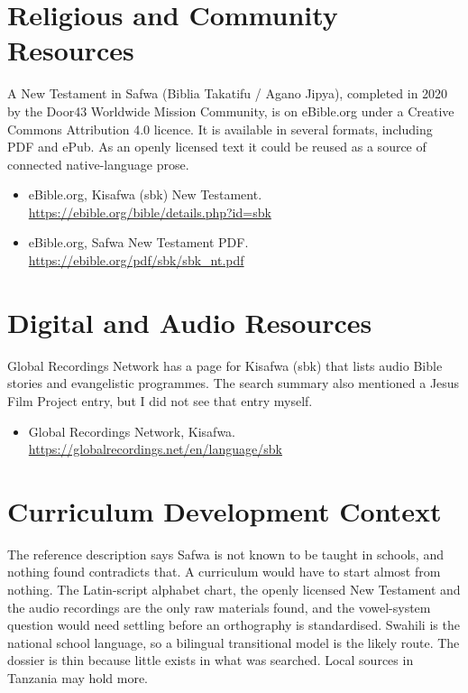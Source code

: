 \documentclass[12pt]{article}
\begin{document}
\section{Religious and Community Resources}
A New Testament in Safwa (Biblia Takatifu / Agano Jipya), completed in 2020 by the Door43 Worldwide Mission Community, is on eBible.org under a Creative Commons Attribution 4.0 licence. It is available in several formats, including PDF and ePub. As an openly licensed text it could be reused as a source of connected native-language prose.
\begin{itemize}
\item eBible.org, Kisafwa (sbk) New Testament. \url{https://ebible.org/bible/details.php?id=sbk}
\item eBible.org, Safwa New Testament PDF. \url{https://ebible.org/pdf/sbk/sbk_nt.pdf}
\end{itemize}

\section{Digital and Audio Resources}
Global Recordings Network has a page for Kisafwa (sbk) that lists audio Bible stories and evangelistic programmes. The search summary also mentioned a Jesus Film Project entry, but I did not see that entry myself.
\begin{itemize}
\item Global Recordings Network, Kisafwa. \url{https://globalrecordings.net/en/language/sbk}
\end{itemize}

\section{Curriculum Development Context}
The reference description says Safwa is not known to be taught in schools, and nothing found contradicts that. A curriculum would have to start almost from nothing. The Latin-script alphabet chart, the openly licensed New Testament and the audio recordings are the only raw materials found, and the vowel-system question would need settling before an orthography is standardised. Swahili is the national school language, so a bilingual transitional model is the likely route. The dossier is thin because little exists in what was searched. Local sources in Tanzania may hold more.
\end{document}
